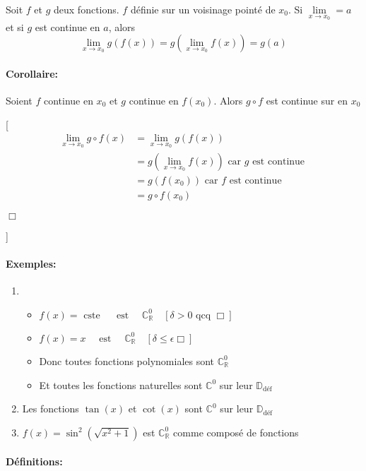 \documentclass[
    11pt,
    a4paper,
    oneside,
    headinlcude, footinclude,
    twoside,
]{report}
\newcommand{\cqfd}[0]{\begin{flushright}$\Box$\end{flushright}}
\begin{document}
Soit $f$ et $g$ deux fonctions. $f$ définie sur un voisinage pointé de $x_{0}$.
Si $\lim\limits_{x \to x_{0}} = a$ et si $g$ est continue en $a$, alors $$\lim_{x \to x_{0}}
g (f (x)) = g ( \lim_{x \to x_{0}} f (x)) = g(a)$$

\paragraph{Corollaire:}

Soient $f$ continue en $x_{0}$ et $g$ continue en $f(x_{0})$. Alors $g \circ f$
est continue sur en $x_{0}$

[
\[
\begin{split}
\lim_{x \to x_{0}} g \circ f (x) &= \lim_{x \to x_{0}} g(f(x))\\
&= g \left( \lim_{x \to x_{0}} f(x)\right) \text{ car $g$ est
continue }\\
&= g(f(x_{0})) \text{ car $f$ est continue }\\
&= g \circ f (x_{0}) 
\end{split}
\]
\cqfd
]

\paragraph{Exemples:}

\begin{enumerate}
\item 
\begin{itemize}
\item $f(x) = \text{ cste } \quad \text{ est } \quad  \mathbb{C}_{\mathbb{R}}^{0}\quad  [\delta > 0 \text{ qcq } \Box]$
\item $f(x) = x \quad \text{ est }\quad  \mathbb{C}^{0}_{\mathbb{R}}\quad  [\delta \leq \epsilon \Box]$
\item Donc toutes fonctions polynomiales sont $\mathbb{C}^{0}_{\mathbb{R}}$
\item Et toutes les fonctions naturelles sont $\mathbb{C}^{0}$ sur leur $\mathbb{D}_{\text{déf}}$
\end{itemize}

\item Les fonctions $\tan(x)$ et $\cot(x)$ sont $\mathbb{C}^{0}$ sur leur $\mathbb{D}_{\text{déf}}$
\item $f(x) = \sin^{2}(\sqrt{x^{2} + 1}) $ est $\mathbb{C}^{0}_{\mathbb{R}}$ comme
composé de fonctions
\end{enumerate}

\paragraph{Définitions:}
\end{document}

